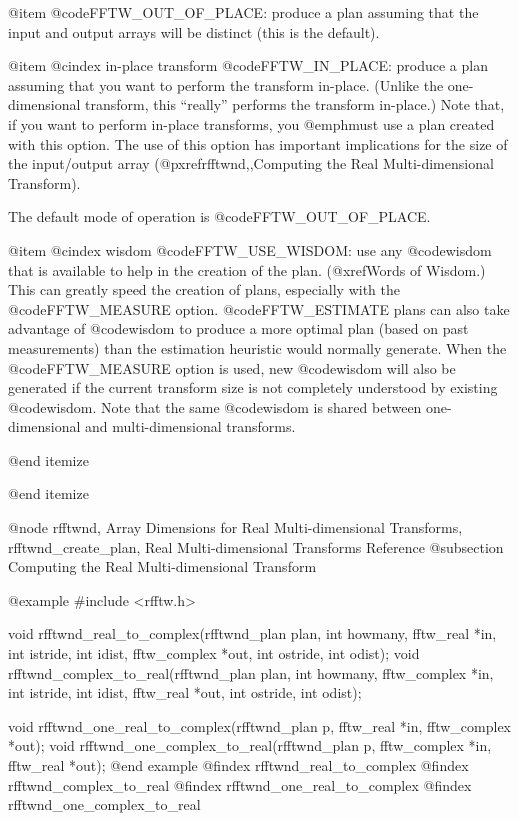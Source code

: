 @item
@code{FFTW_OUT_OF_PLACE}: produce a plan assuming that the input
  and output arrays will be distinct (this is the default).

@item
@cindex in-place transform
@code{FFTW_IN_PLACE}: produce a plan assuming that you want to perform
the transform in-place.  (Unlike the one-dimensional transform, this
``really'' performs the transform in-place.) Note that, if you want to
perform in-place transforms, you @emph{must} use a plan created with
this option.  The use of this option has important implications for the
size of the input/output array (@pxref{rfftwnd,,Computing the Real
Multi-dimensional Transform}).

The default mode of operation is @code{FFTW_OUT_OF_PLACE}.

@item
@cindex wisdom
@code{FFTW_USE_WISDOM}: use any @code{wisdom} that is available to help
in the creation of the plan. (@xref{Words of Wisdom}.)  This can greatly
speed the creation of plans, especially with the @code{FFTW_MEASURE}
option. @code{FFTW_ESTIMATE} plans can also take advantage of
@code{wisdom} to produce a more optimal plan (based on past
measurements) than the estimation heuristic would normally
generate. When the @code{FFTW_MEASURE} option is used, new @code{wisdom}
will also be generated if the current transform size is not completely
understood by existing @code{wisdom}. Note that the same @code{wisdom}
is shared between one-dimensional and multi-dimensional transforms.

@end itemize

@end itemize

@node    rfftwnd, Array Dimensions for Real Multi-dimensional Transforms, rfftwnd_create_plan, Real Multi-dimensional Transforms Reference
@subsection Computing the Real Multi-dimensional Transform

@example
#include <rfftw.h>

void rfftwnd_real_to_complex(rfftwnd_plan plan, int howmany,
                             fftw_real *in, int istride, int idist,
                             fftw_complex *out, int ostride, int odist);
void rfftwnd_complex_to_real(rfftwnd_plan plan, int howmany,
                             fftw_complex *in, int istride, int idist,
                             fftw_real *out, int ostride, int odist);

void rfftwnd_one_real_to_complex(rfftwnd_plan p, fftw_real *in,
                                 fftw_complex *out);
void rfftwnd_one_complex_to_real(rfftwnd_plan p, fftw_complex *in,
                                 fftw_real *out);
@end example
@findex rfftwnd_real_to_complex
@findex rfftwnd_complex_to_real
@findex rfftwnd_one_real_to_complex
@findex rfftwnd_one_complex_to_real

